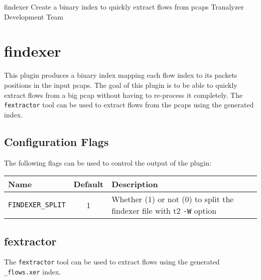 \documentclass[documentation]{subfiles}
\begin{document}
\trantitle
    {findexer}
    {Create a binary index to quickly extract flows from pcaps}
    {Tranalyzer Development Team} %

\section{findexer}\label{s:findexer}

\setlength{\parindent}{0cm}

This plugin produces a binary index mapping each flow index to its packets positions in the input pcaps.
The goal of this plugin is to be able to quickly extract flows from a big pcap without having to
re-process it completely. The {\tt fextractor} tool can be used to extract flows from the pcaps using
the generated index.

\subsection{Configuration Flags}
The following flags can be used to control the output of the plugin:
\begin{center}
    \begin{tabular}{lcl}
        \toprule
        {\bf Name} & {\bf Default} & {\bf Description} \\
        \midrule
        {\tt FINDEXER\_SPLIT} & 1 & Whether (1) or not (0) to split the findexer file with t2 {\tt -W} option\\
        \bottomrule
    \end{tabular}
\end{center}

\subsection{fextractor}

The {\tt fextractor} tool can be used to extract flows using the generated {\tt \_flows.xer} index.
\end{document}

